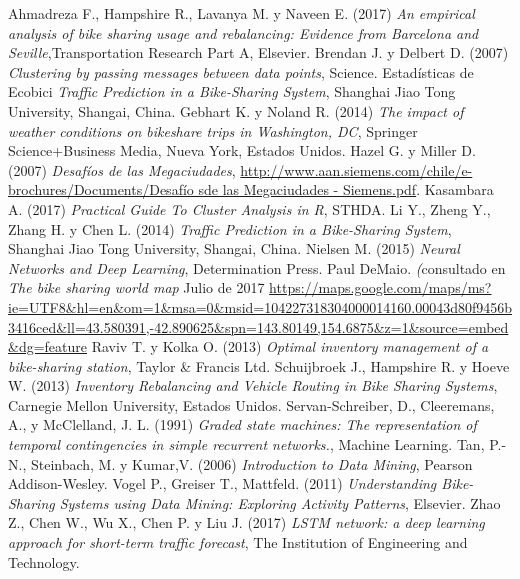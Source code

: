 \documentclass[12pt,spanish]{article}
\begin{document}
	\begin{thebibliography}{9}
		 Ahmadreza F., Hampshire R., Lavanya M. y Naveen E. (2017) \textit{An empirical analysis of bike sharing usage and rebalancing: Evidence from Barcelona and Seville},Transportation Research Part A, Elsevier.
		 Brendan J. y Delbert D. (2007) \textit{Clustering by passing messages between data points}, Science.
		 Estadísticas de Ecobici \textit{Traffic Prediction in a Bike-Sharing System}, Shanghai Jiao Tong University, Shangai, China.
		 Gebhart K. y Noland R. (2014) \textit{The impact of weather conditions on bikeshare trips in Washington, DC}, Springer Science+Business Media, Nueva York, Estados Unidos.
		 Hazel G. y Miller D. (2007) \textit{Desafíos de las Megaciudades}, \underline{http://www.aan.siemens.com/chile/e-brochures/Documents/Desafío sde las Megaciudades - Siemens.pdf}.
		 Kasambara A. (2017) \textit{Practical Guide To Cluster Analysis in R}, STHDA.
		 Li Y., Zheng Y., Zhang H. y Chen L. (2014) \textit{Traffic Prediction in a Bike-Sharing System}, Shanghai Jiao Tong University, Shangai, China.
		 Nielsen M. (2015) \textit{Neural Networks and Deep Learning}, Determination Press.
		 Paul DeMaio. \textit(consultado en \textit{The bike sharing world map} Julio de 2017 \underline{https://maps.google.com/maps/ms?ie=UTF8\&hl=en\&om=1\&msa=0\&msid=104227318304000014160.00043d80f9456b3416ced\&ll=43.580391,-42.890625\&spn=143.80149,154.6875\&z=1\&source=embed\&dg=feature}
		 Raviv T. y Kolka O. (2013) \textit{Optimal inventory management of a bike-sharing station}, Taylor \& Francis Ltd.
		 Schuijbroek J., Hampshire R. y Hoeve W. (2013) \textit{Inventory Rebalancing and Vehicle Routing in Bike	Sharing Systems}, Carnegie Mellon University, Estados Unidos.
		 Servan-Schreiber, D., Cleeremans, A., y McClelland, J. L. (1991) \textit{Graded state machines: The representation of temporal contingencies in simple recurrent networks.}, Machine Learning.
		 Tan, P.-N., Steinbach, M. y Kumar,V. (2006) \textit{Introduction to Data Mining}, Pearson Addison-Wesley.
		 Vogel P., Greiser T., Mattfeld. (2011) \textit{Understanding Bike-Sharing Systems using Data Mining: Exploring Activity Patterns}, Elsevier.
		 Zhao Z., Chen W., Wu X., Chen P. y Liu J. (2017) \textit{LSTM network: a deep learning approach for short-term traffic forecast}, The Institution of Engineering and Technology.

	
	\end{thebibliography}
\end{document}
